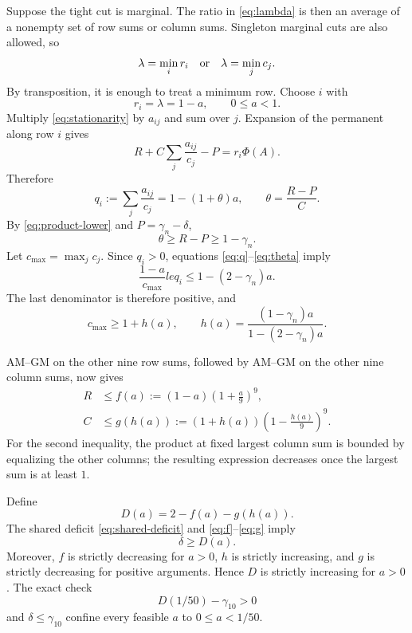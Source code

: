 \documentclass[11pt]{article}
\theoremstyle{remark}
\begin{document}
Suppose the tight cut is marginal.  The ratio in \eqref{eq:lambda} is then
an average of a nonempty set of row sums or column sums.  Singleton marginal
cuts are also allowed, so
\[
 \lambda=\min_i r_i
 \quad\hbox{or}\quad
 \lambda=\min_j c_j.
\]
By transposition, it is enough to treat a minimum row.  Choose $i$ with
\[
 r_i=\lambda=1-a,
 \qquad 0\le a<1.
\]
Multiply \eqref{eq:stationarity} by $a_{ij}$ and sum over $j$.  Expansion of
the permanent along row $i$ gives
\[
 R+C\sum_j\frac{a_{ij}}{c_j}-P=r_i\Phi(A).
\]
Therefore
\begin{equation}\label{eq:q}
 q_i:=\sum_j\frac{a_{ij}}{c_j}
 =1-(1+\theta)a,
 \qquad
 \theta=\frac{R-P}{C}.
\end{equation}
By \eqref{eq:product-lower} and $P=\gamma_n-\delta$,
\begin{equation}\label{eq:theta}
 \theta\ge R-P\ge1-\gamma_n.
\end{equation}
Let $c_{\max}=\max_jc_j$.  Since $q_i>0$, equations
\eqref{eq:q}--\eqref{eq:theta} imply
\[
 \frac{1-a}{c_{\max}}le q_i
 \le1-(2-\gamma_n)a.
\]
The last denominator is therefore positive, and
\begin{equation}\label{eq:h}
 c_{\max}\ge1+h(a),
 \qquad
 h(a)=\frac{(1-\gamma_n)a}{1-(2-\gamma_n)a}.
\end{equation}

AM--GM on the other nine row sums, followed by AM--GM on the other nine
column sums, now gives
\begin{align}
 R&\le f(a):=(1-a)\left(1+\frac a9\right)^9,
 \label{eq:f}\\
 C&\le g(h(a)):=(1+h(a))\left(1-\frac{h(a)}9\right)^9.
 \label{eq:g}
\end{align}
For the second inequality, the product at fixed largest column sum is bounded
by equalizing the other columns; the resulting expression decreases once the
largest sum is at least $1$.

Define
\begin{equation}\label{eq:D}
 D(a)=2-f(a)-g(h(a)).
\end{equation}
The shared deficit \eqref{eq:shared-deficit} and
\eqref{eq:f}--\eqref{eq:g} imply
\begin{equation}\label{eq:delta-D}
 \delta\ge D(a).
\end{equation}
Moreover, $f$ is strictly decreasing for $a>0$, $h$ is strictly increasing,
and $g$ is strictly decreasing for positive arguments.  Hence $D$ is strictly
increasing for $a>0$.  The exact check
\begin{equation}\label{eq:D-endpoint}
 D(1/50)-\gamma_{10}>0
\end{equation}
and $\delta\le\gamma_{10}$ confine every feasible $a$ to
$0\le a<1/50$.
\end{document}
